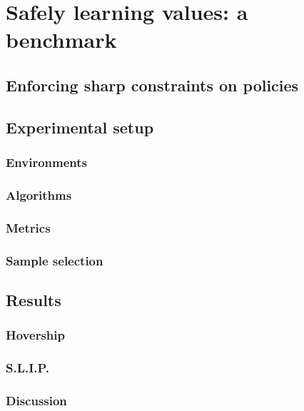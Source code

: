 \chapter{Safely learning values: a benchmark} \label{chap:benchmark}


\section{Enforcing sharp constraints on policies}

\section{Experimental setup}
\subsection{Environments}
\subsection{Algorithms}
\subsection{Metrics}
\subsection{Sample selection}

\section{Results}
\subsection{Hovership}
\subsection{S.L.I.P.}
\subsection{Discussion}